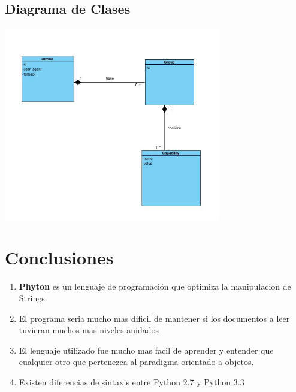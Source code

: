 \documentclass[11pt]{article}
\begin{document}
\subsection{\textbf{Diagrama de Clases}}

				\begin{center}
				\includegraphics[width=0.71\textwidth]{images/class_diagram}
				\end{center}

\section{\textbf{Conclusiones}}
\begin{enumerate}
\item
{\textbf{Phyton}} es un lenguaje de programación que optimiza la manipulacion de Strings.
\item
El programa seria mucho mas dificil de mantener si los documentos a leer tuvieran muchos mas niveles anidados
\item
El lenguaje utilizado fue mucho mas facil de aprender y entender que cualquier otro que pertenezca al paradigma orientado a objetos.
\item
Existen diferencias de sintaxis entre Python 2.7 y Python 3.3

\end{enumerate}
\end{document}
